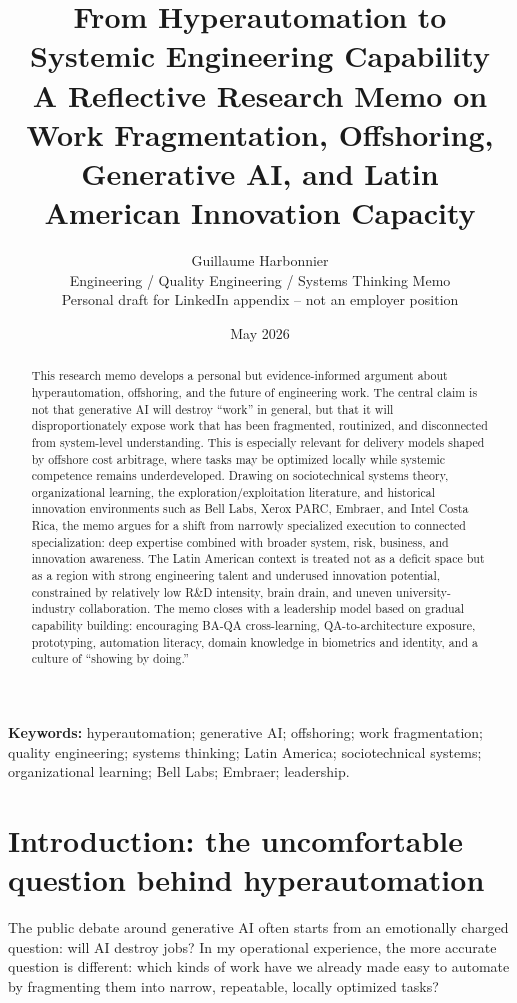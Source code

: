 \documentclass[11pt,a4paper]{article}
\title{\textbf{From Hyperautomation to Systemic Engineering Capability}\\
\large A Reflective Research Memo on Work Fragmentation, Offshoring, Generative AI, and Latin American Innovation Capacity}
\author{Guillaume Harbonnier\\
\small Engineering / Quality Engineering / Systems Thinking Memo\\
\small Personal draft for LinkedIn appendix -- not an employer position}
\date{May 2026}
\begin{document}
\maketitle

\begin{abstract}
This research memo develops a personal but evidence-informed argument about hyperautomation, offshoring, and the future of engineering work. The central claim is not that generative AI will destroy ``work'' in general, but that it will disproportionately expose work that has been fragmented, routinized, and disconnected from system-level understanding. This is especially relevant for delivery models shaped by offshore cost arbitrage, where tasks may be optimized locally while systemic competence remains underdeveloped. Drawing on sociotechnical systems theory, organizational learning, the exploration/exploitation literature, and historical innovation environments such as Bell Labs, Xerox PARC, Embraer, and Intel Costa Rica, the memo argues for a shift from narrowly specialized execution to connected specialization: deep expertise combined with broader system, risk, business, and innovation awareness. The Latin American context is treated not as a deficit space but as a region with strong engineering talent and underused innovation potential, constrained by relatively low R\&D intensity, brain drain, and uneven university-industry collaboration. The memo closes with a leadership model based on gradual capability building: encouraging BA-QA cross-learning, QA-to-architecture exposure, prototyping, automation literacy, domain knowledge in biometrics and identity, and a culture of ``showing by doing.''
\end{abstract}

\noindent\textbf{Keywords:} hyperautomation; generative AI; offshoring; work fragmentation; quality engineering; systems thinking; Latin America; sociotechnical systems; organizational learning; Bell Labs; Embraer; leadership.

\section{Introduction: the uncomfortable question behind hyperautomation}
The public debate around generative AI often starts from an emotionally charged question: will AI destroy jobs? In my operational experience, the more accurate question is different: which kinds of work have we already made easy to automate by fragmenting them into narrow, repeatable, locally optimized tasks?
\end{document}
